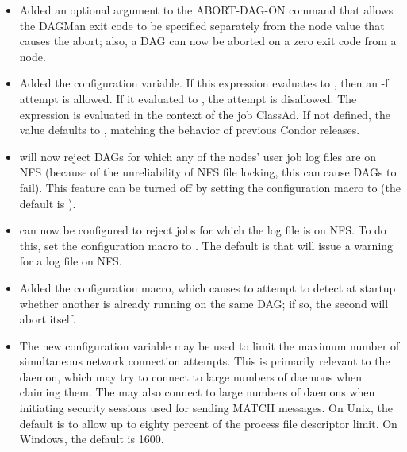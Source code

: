 \begin{itemize}

\item Added an optional argument to the  ABORT-DAG-ON
command that allows the DAGMan exit code to be specified separately
from the node value that causes the abort; also, a DAG can now be
aborted on a zero exit code from a node.

\item Added the  configuration variable.
If this expression evaluates to ,
then an  -f attempt is allowed.  If it evaluated to ,
the attempt is disallowed.
The expression is evaluated in the context of the job ClassAd.
If not defined, the value defaults to , matching the behavior of
previous Condor releases.

\item {} will now reject DAGs for which any of the nodes'
user job log files are on NFS (because of the unreliability of NFS
file locking, this can cause DAGs to fail).  This feature can be
turned off by setting the 
configuration macro to  (the default is ).

\item {} can now be configured to reject jobs for which
the log file is on NFS.
To do this, set the 
configuration macro to .
The default is that  will issue a warning
for a log file on NFS.

\item Added the  configuration macro,
which causes
 to attempt to detect at startup whether another
 is already running on the same DAG; if so, the second
 will abort itself.

\item The new configuration variable
 may be used to limit the
maximum number of simultaneous network connection attempts.  This is
primarily relevant to the  daemon, which may try to connect to
large numbers of  daemons when claiming them.
The  may also
connect to large numbers of  daemons when initiating
security sessions
used for sending MATCH messages.  On Unix, the default is to allow up to
eighty percent of the process file descriptor limit.  On Windows, the
default is 1600.


\end{itemize}
